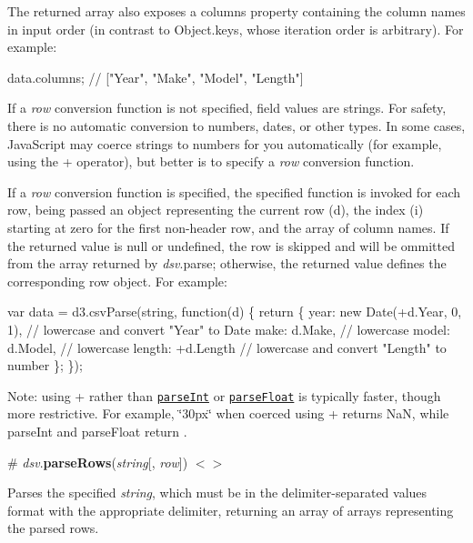 The returned array also exposes a {\ttfamily columns} property containing the column names in input order (in contrast to Object.\+keys, whose iteration order is arbitrary). For example\+:


\begin{DoxyCode}
data.columns; // ["Year", "Make", "Model", "Length"]
\end{DoxyCode}


If a {\itshape row} conversion function is not specified, field values are strings. For safety, there is no automatic conversion to numbers, dates, or other types. In some cases, Java\+Script may coerce strings to numbers for you automatically (for example, using the {\ttfamily +} operator), but better is to specify a {\itshape row} conversion function.

If a {\itshape row} conversion function is specified, the specified function is invoked for each row, being passed an object representing the current row ({\ttfamily d}), the index ({\ttfamily i}) starting at zero for the first non-\/header row, and the array of column names. If the returned value is null or undefined, the row is skipped and will be ommitted from the array returned by {\itshape dsv}.parse; otherwise, the returned value defines the corresponding row object. For example\+:


\begin{DoxyCode}
var data = d3.csvParse(string, function(d) \{
  return \{
    year: new Date(+d.Year, 0, 1), // lowercase and convert "Year" to Date
    make: d.Make, // lowercase
    model: d.Model, // lowercase
    length: +d.Length // lowercase and convert "Length" to number
  \};
\});
\end{DoxyCode}


Note\+: using {\ttfamily +} rather than \href{https://developer.mozilla.org/en/JavaScript/Reference/Global_Objects/parseInt}{\tt parse\+Int} or \href{https://developer.mozilla.org/en/JavaScript/Reference/Global_Objects/parseFloat}{\tt parse\+Float} is typically faster, though more restrictive. For example, {\ttfamily \char`\"{}30px\char`\"{}} when coerced using {\ttfamily +} returns {\ttfamily NaN}, while parse\+Int and parse\+Float return {}.

\label{_dsv_parseRows}%
\# {\itshape dsv}.{\bfseries parse\+Rows}({\itshape string}\mbox{[}, {\itshape row}\mbox{]}) \href{https://github.com/d3/d3-dsv/blob/master/src/dsv.js#L43}{\tt $<$$>$}

Parses the specified {\itshape string}, which must be in the delimiter-\/separated values format with the appropriate delimiter, returning an array of arrays representing the parsed rows.

